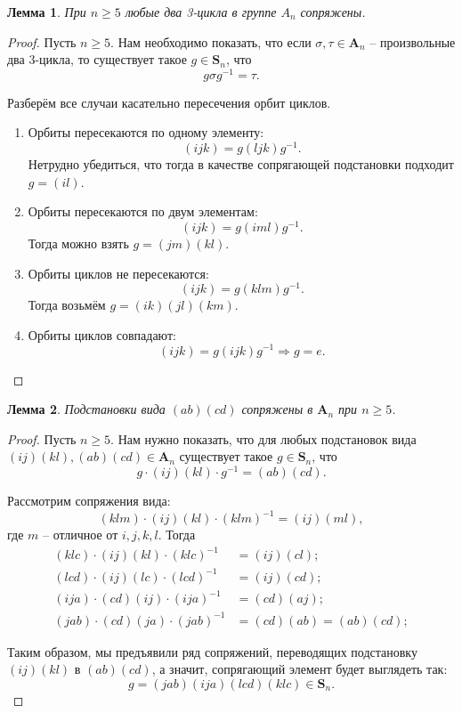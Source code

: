 \documentclass{article}
\newtheorem{lemma}{Лемма}[section]
\begin{document}
\begin{lemma} \label{wnko}
    При $n \geqslant 5$ любые два 3-цикла в группе $A_n$ сопряжены.
\end{lemma}
\begin{proof}
    Пусть $n \geqslant 5$. Нам необходимо показать, что если $\sigma, \tau \in \mathbf{A}_n$ -- произвольные два 3-цикла, то существует такое $g \in \mathbf{S}_n$, что $$ g \sigma g^{-1} = \tau. $$
    
    Разберём все случаи касательно пересечения орбит циклов.
    \begin{enumerate}
        \item Орбиты пересекаются по одному элементу: $$ (ijk) = g (ljk) g^{-1}. $$ Нетрудно убедиться, что тогда в качестве сопрягающей подстановки подходит $g = (il)$.
        \item Орбиты пересекаются по двум элементам: $$ (ijk) = g (iml) g^{-1}. $$ Тогда можно взять $g = (jm)(kl)$.
        \item Орбиты циклов не пересекаются: $$ (ijk) = g (klm) g^{-1}. $$ Тогда возьмём $g = (ik)(jl)(km)$.
        \item Орбиты циклов совпадают: $$ (ijk) = g (ijk) g^{-1} \Rightarrow g = e. $$
    \end{enumerate}
\end{proof}

\begin{lemma} \label{Wrqt}
    Подстановки вида $(ab)(cd)$ сопряжены в $\mathbf{A}_n$ при $n \geqslant 5$.
\end{lemma}
\begin{proof}
    Пусть $n \geqslant 5$. Нам нужно показать, что для любых подстановок вида $(ij)(kl), (ab)(cd) \in \mathbf{A}_n$ существует такое $g \in \mathbf{S}_n$, что $$ g \cdot (ij)(kl) \cdot g^{-1} = (ab)(cd). $$

    Рассмотрим сопряжения вида: $$ (klm) \cdot (ij)(kl) \cdot (klm)^{-1} = (ij)(ml), $$ где $m$ -- отличное от $i,j,k,l$.
    Тогда
    \begin{align*}
        (klc) \cdot (ij)(kl) \cdot (klc)^{-1} &= (ij)(cl); \\
        (lcd) \cdot (ij)(lc) \cdot (lcd)^{-1} &= (ij)(cd); \\
        (ija) \cdot (cd)(ij) \cdot (ija)^{-1} &= (cd)(aj); \\
        (jab) \cdot (cd)(ja) \cdot (jab)^{-1} &= (cd)(ab) = (ab)(cd);
    \end{align*}

    Таким образом, мы предъявили ряд сопряжений, переводящих подстановку $(ij)(kl)$ в $(ab)(cd)$, а значит, сопрягающий элемент будет выглядеть так: $$ g = (jab)(ija)(lcd)(klc) \in \mathbf{S}_n. $$
\end{proof}
\end{document}
